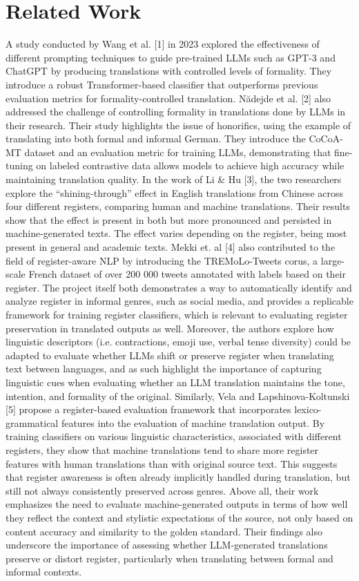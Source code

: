 \documentclass[fleqn,moreauthors,10pt]{ds_report}
\begin{document}
	\section*{Related Work}
	A study conducted by Wang et al. [1] in 2023 explored the effectiveness of different prompting techniques to guide pre-trained LLMs such as GPT-3 and ChatGPT by producing translations with controlled levels of formality. They introduce a robust Transformer-based classifier that outperforms previous evaluation metrics for formality-controlled translation. N\u{a}dejde et al. [2] also addressed the challenge of controlling formality in translations done by LLMs in their research. Their study highlights the issue of honorifics, using the example of translating \grqq into both formal and informal German. They introduce the CoCoA-MT dataset and an evaluation metric for training LLMs, demonstrating that fine-tuning on labeled contrastive data allows models to achieve high accuracy while maintaining translation quality. 
	In the work of Li \& Hu [3], the two researchers explore the “shining-through” effect in English translations from Chinese across four different registers, comparing human and machine translations. Their results show that the effect is present in both but more pronounced and persisted in machine-generated texts. The effect varies depending on the register, being most present in general and academic texts. 
	Mekki et. al [4] also contributed to the field of register-aware NLP by introducing the TREMoLo-Tweets corus, a large-scale French dataset of over 200 000 tweets annotated with labels based on their register. The project itself both demonstrates a way to automatically identify and analyze register in informal genres, such as social media, and provides a replicable framework for training register classifiers, which is relevant to evaluating register preservation in translated outputs as well. Moreover, the authors explore how linguistic descriptors (i.e. contractions, emoji use, verbal tense diversity) could be adapted to evaluate whether LLMs shift or preserve register when translating text between languages, and as such highlight the importance of capturing linguistic cues when evaluating whether an LLM translation maintains the tone, intention, and formality of the original.
	Similarly, Vela and Lapshinova-Koltunski [5] propose a register-based evaluation framework that incorporates lexico-grammatical features into the evaluation of machine translation output. By training classifiers on various linguistic characteristics, associated with different registers, they show that machine translations tend to share more register features with human translations than with original source text. This suggests that register awareness is often already implicitly handled during translation, but still not always consistently preserved across genres. Above all, their work emphasizes the need to evaluate machine-generated outputs in terms of how well they reflect the context and stylistic expectations of the source, not only based on content accuracy and similarity to the golden standard. Their findings also underscore the importance of assessing whether LLM-generated translations preserve or distort register, particularly when translating between formal and informal contexts.
	
\end{document}
